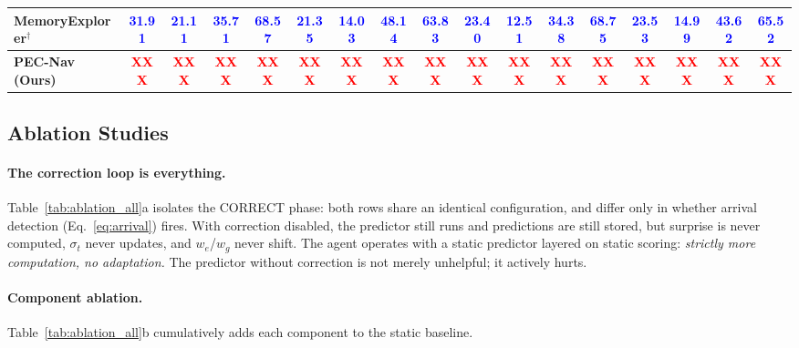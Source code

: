 \begin{table}[t]
{\begin{tabular}{lcccccccccccccccc}
MemoryExplorer$^\dagger$~\cite{wang2026memoryexplorer} & \textcolor{blue}{31.91} & \textcolor{blue}{21.11} & \textcolor{blue}{35.71} & \textcolor{blue}{68.57} & \textcolor{blue}{21.35} & \textcolor{blue}{14.03} & \textcolor{blue}{48.14} & \textcolor{blue}{63.83} & \textcolor{blue}{23.40} & \textcolor{blue}{12.51} & \textcolor{blue}{34.38} & \textcolor{blue}{68.75} & \textcolor{blue}{23.53} & \textcolor{blue}{14.99} & \textcolor{blue}{43.62} & \textcolor{blue}{65.52} \\
\midrule
\textbf{PEC-Nav (Ours)} & \textcolor{red}{\textbf{XXX}} & \textcolor{red}{\textbf{XXX}} & \textcolor{red}{\textbf{XXX}} & \textcolor{red}{\textbf{XXX}} & \textcolor{red}{\textbf{XXX}} & \textcolor{red}{\textbf{XXX}} & \textcolor{red}{\textbf{XXX}} & \textcolor{red}{\textbf{XXX}} & \textcolor{red}{\textbf{XXX}} & \textcolor{red}{\textbf{XXX}} & \textcolor{red}{\textbf{XXX}} & \textcolor{red}{\textbf{XXX}} & \textcolor{red}{\textbf{XXX}} & \textcolor{red}{\textbf{XXX}} & \textcolor{red}{\textbf{XXX}} & \textcolor{red}{\textbf{XXX}} \\
\bottomrule
\end{tabular}%
}
\end{table}

\subsection{Ablation Studies}

\paragraph{The correction loop is everything.} Table~\ref{tab:ablation_all}a isolates the CORRECT phase: both rows share an identical configuration, and differ only in whether arrival detection (Eq.~\ref{eq:arrival}) fires. With correction disabled, the predictor still runs and predictions are still stored, but surprise is never computed, $\sigma_t$ never updates, and $w_e$/$w_g$ never shift. The agent operates with a static predictor layered on static scoring: \emph{strictly more computation, no adaptation.} The predictor without correction is not merely unhelpful; it actively hurts.

\paragraph{Component ablation.} Table~\ref{tab:ablation_all}b cumulatively adds each component to the static baseline.

